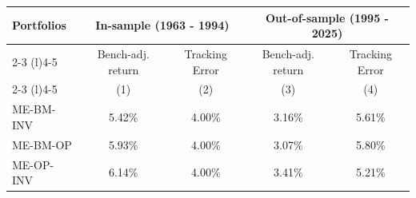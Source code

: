 \documentclass[
]{article}
\author{}
\date{\vspace{-2.5em}}
\begin{document}
\begin{tabular}{lcccc}
  \toprule \multirow{2}{*}{Portfolios} & \multicolumn{2}{c}{In-sample (1963 - 1994)} & \multicolumn{2}{c}{Out-of-sample (1995 - 2025)} \\
 \cmidrule(l){2-3} \cmidrule(l){4-5} & Bench-adj. return & Tracking Error & Bench-adj. return & Tracking Error  \\
 \cmidrule(l){2-3} \cmidrule(l){4-5}  \vspace{5pt}  & (1) & (2) & (3) & (4) \\ 
  ME-BM-INV & 5.42\% & 4.00\% & 3.16\% & 5.61\% \\ 
  ME-BM-OP & 5.93\% & 4.00\% & 3.07\% & 5.80\% \\ 
  ME-OP-INV & 6.14\% & 4.00\% & 3.41\% & 5.21\% \\ 
   \bottomrule 
\end{tabular}
\end{document}
